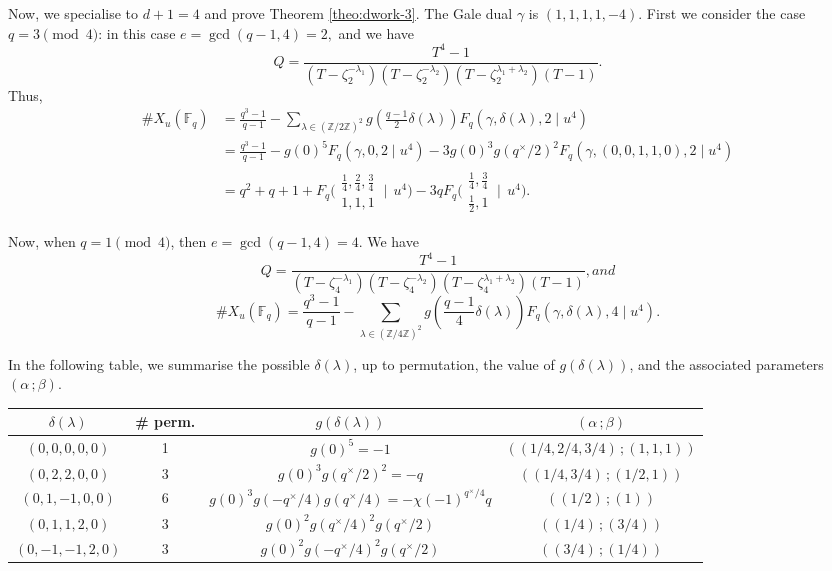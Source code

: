 \documentclass[11pt, reqno]{amsart}
\theoremstyle{plain}
\theoremstyle{definition}
\newcommand{\Z}{\mathbb{Z}}
\newcommand{\F}{\mathbb{F}}
\newcommand{\ga}{\gamma}
\newcommand{\be}{\beta}
\newcommand{\al}{\alpha}
\begin{document}
Now, we specialise to $d+1=4$ and prove Theorem \ref{theo:dwork-3}.
The Gale dual $\ga$ is $(1,1,1,1,-4)$.
First we consider the case $q=3 \pmod{4}$: in this case $e=\gcd(q-1,4) = 2,$ and we have
    \[
    Q= \frac{T^{4}-1}{(T- \zeta_2^{-\lambda_1}) (T- \zeta_2^{-\lambda_{2}}) (T- \zeta_2^{\lambda_1+\lambda_{2}})(T-1) }.
    \]
    Thus, 
    \begin{align*}
     \#X_u(\F_q) 
     &= \frac{q^{3}-1}{q-1} - \sum_{\lambda \in (\Z/2\Z)^{2}} g\left(\frac{q-1}{2}\delta(\lambda)\right)F_q\left(\gamma,\delta(\lambda),2 \mid u^{4}\right)\\
    &= \frac{q^{3}-1}{q-1} - g(0)^5 F_q(\ga,0,2 \mid u^4) - 3g(0)^3 g\left(q^\times/2 \right)^2 F_q(\ga, (0,0,1,1,0),2 \mid u^4)\\
     &= q^2+q+1 +  F_q\biggl(\begin{matrix} \frac{1}{4}, \frac{2}{4}, \frac{3}{4} \\ 1,  1, 1 \end{matrix} \:\bigg|\:\: u^{4} \biggr)- 3 q F_q\biggl(\begin{matrix} \frac{1}{4},  \frac{3}{4} \\ \frac{1}{2},  1 \end{matrix} \:\bigg|\:\: u^{4} \biggr).
    \end{align*}
    
Now, when $q=1 \pmod{4}$, then $e=\gcd(q-1,4) = 4.$ We have
    \[
    Q= \frac{T^{4}-1}{(T- \zeta_4^{-\lambda_1}) (T- \zeta_4^{-\lambda_{2}}) (T- \zeta_4^{\lambda_1+\lambda_{2}})(T-1) }, and
    \]
     \begin{equation}\label{eq:dwork-d-3}
        \#X_u(\F_q) 
     = \frac{q^{3}-1}{q-1} - \sum_{\lambda \in (\Z/4\Z)^{2}} g\left(\frac{q-1}{4}\delta(\lambda)\right)F_q\left(\gamma,\delta(\lambda),4 \mid u^{4}\right). 
     \end{equation}
     
    In the following table, we summarise the possible $\delta(\lambda)$, up to permutation, the value of $g(\delta(\lambda))$, and the associated parameters $(\al \, ; \be)$.
    \begin{table}[h!]
    \centering
    \begin{tabular}{c c c c}
    \hline
    $\delta(\lambda)$ & \# perm. & $g(\delta(\lambda))$ & $(\alpha \, ; \beta)$ \\
    \hline
    $(0,0,0,0,0)$      & 1 & $g(0)^5=-1$ &  $((1/4,2/4,3/4)\, ;(1,1,1))$\\
    $(0,2,2,0,0)$      & 3 & $g(0)^3g(q^\times/2)^2=-q$ & $((1/4,3/4)\, ;(1/2,1))$ \\
    $(0,1,-1,0,0)$     & 6 & $g(0)^3g(-q^\times/4)g(q^\times/4)= -\chi(-1)^{q^\times/4}q$  & $((1/2) \, ; (1) )$ \\
    $(0,1,1,2,0)$      & 3 &$g(0)^2g\left(q^\times/4\right)^2g\left(q^\times/2\right)$  & $((1/4)\,;(3/4))$ \\
    $(0,-1,-1,2,0)$    & 3 &$g(0)^2g\left(-q^\times/4\right)^2   g\left(q^\times/2\right)$  & $((3/4)\,;(1/4))$ \\
    \end{tabular}
    \end{table}
    
\end{document}
